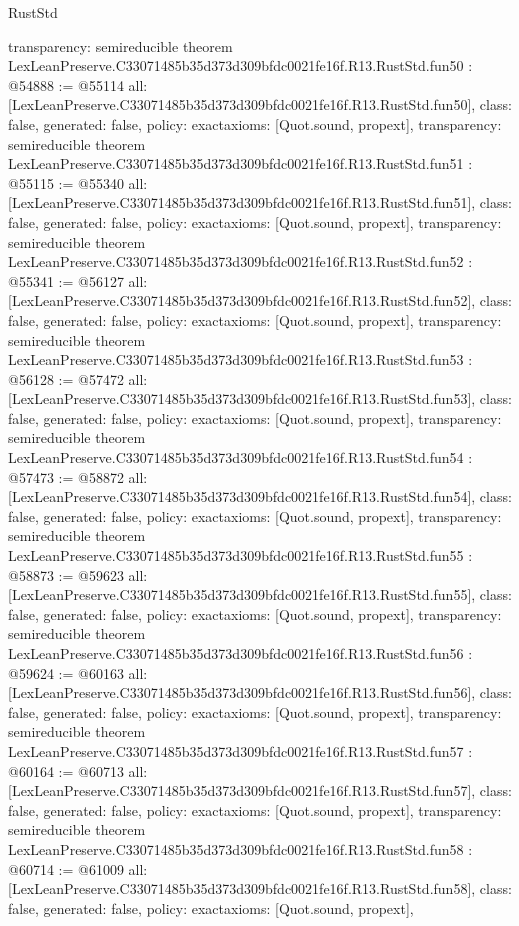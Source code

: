 \begin{lexlean}{RustStd}
\begin{coremodule}
{  transparency: semireducible
}
theorem LexLeanPreserve.C33071485b35d373d309bfdc0021fe16f.R13.RustStd.fun50 : @54888 := @55114 {
  all: [LexLeanPreserve.C33071485b35d373d309bfdc0021fe16f.R13.RustStd.fun50],
  class: false,
  generated: false,
  policy: exact{axioms: [Quot.sound, propext]},
  transparency: semireducible
}
theorem LexLeanPreserve.C33071485b35d373d309bfdc0021fe16f.R13.RustStd.fun51 : @55115 := @55340 {
  all: [LexLeanPreserve.C33071485b35d373d309bfdc0021fe16f.R13.RustStd.fun51],
  class: false,
  generated: false,
  policy: exact{axioms: [Quot.sound, propext]},
  transparency: semireducible
}
theorem LexLeanPreserve.C33071485b35d373d309bfdc0021fe16f.R13.RustStd.fun52 : @55341 := @56127 {
  all: [LexLeanPreserve.C33071485b35d373d309bfdc0021fe16f.R13.RustStd.fun52],
  class: false,
  generated: false,
  policy: exact{axioms: [Quot.sound, propext]},
  transparency: semireducible
}
theorem LexLeanPreserve.C33071485b35d373d309bfdc0021fe16f.R13.RustStd.fun53 : @56128 := @57472 {
  all: [LexLeanPreserve.C33071485b35d373d309bfdc0021fe16f.R13.RustStd.fun53],
  class: false,
  generated: false,
  policy: exact{axioms: [Quot.sound, propext]},
  transparency: semireducible
}
theorem LexLeanPreserve.C33071485b35d373d309bfdc0021fe16f.R13.RustStd.fun54 : @57473 := @58872 {
  all: [LexLeanPreserve.C33071485b35d373d309bfdc0021fe16f.R13.RustStd.fun54],
  class: false,
  generated: false,
  policy: exact{axioms: [Quot.sound, propext]},
  transparency: semireducible
}
theorem LexLeanPreserve.C33071485b35d373d309bfdc0021fe16f.R13.RustStd.fun55 : @58873 := @59623 {
  all: [LexLeanPreserve.C33071485b35d373d309bfdc0021fe16f.R13.RustStd.fun55],
  class: false,
  generated: false,
  policy: exact{axioms: [Quot.sound, propext]},
  transparency: semireducible
}
theorem LexLeanPreserve.C33071485b35d373d309bfdc0021fe16f.R13.RustStd.fun56 : @59624 := @60163 {
  all: [LexLeanPreserve.C33071485b35d373d309bfdc0021fe16f.R13.RustStd.fun56],
  class: false,
  generated: false,
  policy: exact{axioms: [Quot.sound, propext]},
  transparency: semireducible
}
theorem LexLeanPreserve.C33071485b35d373d309bfdc0021fe16f.R13.RustStd.fun57 : @60164 := @60713 {
  all: [LexLeanPreserve.C33071485b35d373d309bfdc0021fe16f.R13.RustStd.fun57],
  class: false,
  generated: false,
  policy: exact{axioms: [Quot.sound, propext]},
  transparency: semireducible
}
theorem LexLeanPreserve.C33071485b35d373d309bfdc0021fe16f.R13.RustStd.fun58 : @60714 := @61009 {
  all: [LexLeanPreserve.C33071485b35d373d309bfdc0021fe16f.R13.RustStd.fun58],
  class: false,
  generated: false,
  policy: exact{axioms: [Quot.sound, propext]},
}
\end{coremodule}
\end{lexlean}
